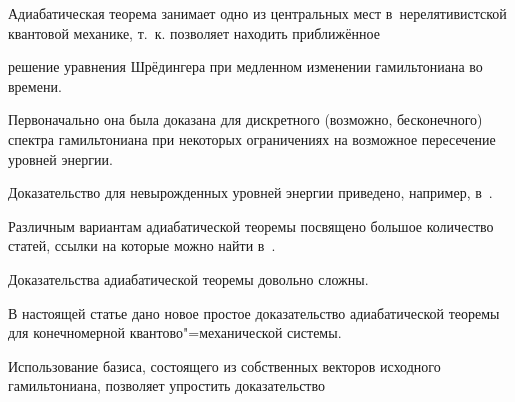 








\date{17/II/2011} %






\maketitle



Адиабатическая теорема \cite{BorFoc28} занимает одно из центральных мест в~нерелятивистской квантовой механике, т.~к. позволяет находить приближённое

решение уравнения Шрёдингера при медленном изменении гамильтониана во времени.

Первоначально она была доказана для дискретного (возможно, бесконечного) спектра гамильтониана при некоторых ограничениях на возможное пересечение уровней энергии. 

Доказательство для невырожденных уровней энергии приведено, например, в~\cite{Messia62R}. 

Различным вариантам адиабатической теоремы посвящено большое количество статей, ссылки на которые можно найти в~\cite{Joye92,Teufel03}.

Доказательства адиабатической теоремы довольно \mbox{сложны.}



В настоящей статье дано новое простое доказательство адиабатической теоремы для конечномерной квантово"=механической системы. 

Использование базиса, состоящего из собственных векторов исходного гамильтониана, позволяет упростить доказательство

